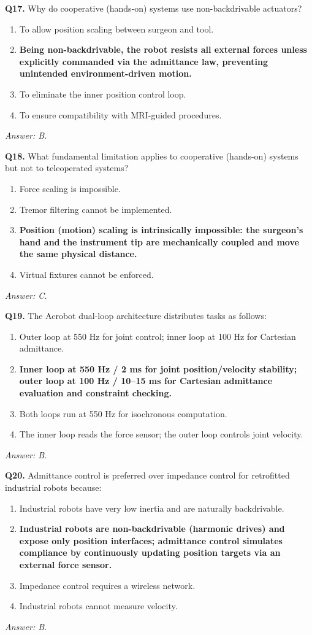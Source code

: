 \documentclass[11pt,a4paper,twoside]{report}
\begin{document}
\bigskip
\textbf{Q17.} Why do cooperative (hands-on) systems use non-backdrivable actuators?
\begin{enumerate}[label=\Alph*.]
    \item To allow position scaling between surgeon and tool.
    \item \textbf{Being non-backdrivable, the robot resists all external forces unless explicitly commanded via the admittance law, preventing unintended environment-driven motion.}
    \item To eliminate the inner position control loop.
    \item To ensure compatibility with MRI-guided procedures.
\end{enumerate}
\textit{Answer: B.}

\bigskip
\textbf{Q18.} What fundamental limitation applies to cooperative (hands-on) systems but not to teleoperated systems?
\begin{enumerate}[label=\Alph*.]
    \item Force scaling is impossible.
    \item Tremor filtering cannot be implemented.
    \item \textbf{Position (motion) scaling is intrinsically impossible: the surgeon's hand and the instrument tip are mechanically coupled and move the same physical distance.}
    \item Virtual fixtures cannot be enforced.
\end{enumerate}
\textit{Answer: C.}

\bigskip
\textbf{Q19.} The Acrobot dual-loop architecture distributes tasks as follows:
\begin{enumerate}[label=\Alph*.]
    \item Outer loop at 550 Hz for joint control; inner loop at 100 Hz for Cartesian admittance.
    \item \textbf{Inner loop at 550 Hz / 2 ms for joint position/velocity stability; outer loop at 100 Hz / 10--15 ms for Cartesian admittance evaluation and constraint checking.}
    \item Both loops run at 550 Hz for isochronous computation.
    \item The inner loop reads the force sensor; the outer loop controls joint velocity.
\end{enumerate}
\textit{Answer: B.}

\bigskip
\textbf{Q20.} Admittance control is preferred over impedance control for retrofitted industrial robots because:
\begin{enumerate}[label=\Alph*.]
    \item Industrial robots have very low inertia and are naturally backdrivable.
    \item \textbf{Industrial robots are non-backdrivable (harmonic drives) and expose only position interfaces; admittance control simulates compliance by continuously updating position targets via an external force sensor.}
    \item Impedance control requires a wireless network.
    \item Industrial robots cannot measure velocity.
\end{enumerate}
\textit{Answer: B.}
\end{document}
